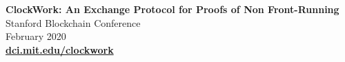 
\textbf{ClockWork: An Exchange Protocol for Proofs of Non Front-Running} \\
Stanford Blockchain Conference \\
February 2020 \\
\href{https://dci.mit.edu/clockwork}{\textbf{dci.mit.edu/clockwork}}

